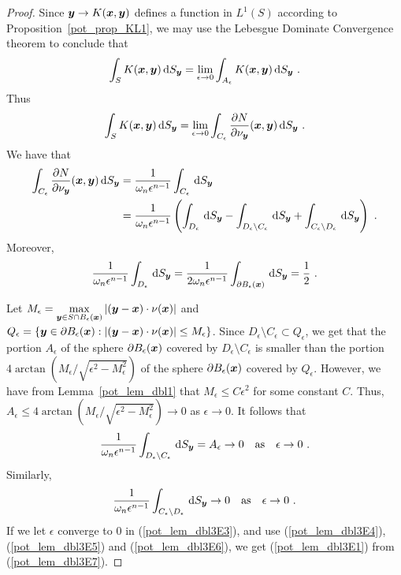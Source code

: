 \begin{proof}
Since ${\bm{y}} \to K({\bm{x}},{\bm{y}})$ defines a function in
$\displaystyle L^1(S)$
according to Proposition~\ref{pot_prop_KL1}, we may use the Lebesgue
Dominate Convergence theorem to conclude that
\[
\int_S  K({\bm{x}},{\bm{y}}) \,\mathrm{d}{S}_{{\bm{y}}}
= \lim_{\epsilon \to 0} \int_{A_\epsilon}  K({\bm{x}},{\bm{y}}) \,\mathrm{d}{S}_{{\bm{y}}} \ .
\]
Thus
\begin{equation} \label{pot_lem_dbl3E7}
\int_S  K(\VEC{x},\VEC{y}) \dss{S}{y}
= \lim_{\epsilon \to 0}
\int_{C_\epsilon} \pdydx{N}{\nu_\VEC{y}}(\VEC{x},\VEC{y}) \dss{S}{y} \ .
\end{equation}
We have that
\begin{align}
\int_{C_\epsilon} \frac{\partial{N}}{\partial \nu_{\bm{y}}}({\bm{x}},{\bm{y}}) \,\mathrm{d}{S}_{{\bm{y}}}
&= \frac{1}{\omega_n \epsilon^{n-1}} \int_{C_\epsilon} \,\mathrm{d}{S}_{{\bm{y}}} \nonumber \\
&= \frac{1}{\omega_n \epsilon^{n-1}} \left( \int_{D_\epsilon} \,\mathrm{d}{S}_{{\bm{y}}}
- \int_{D_\epsilon \setminus C_\epsilon} \,\mathrm{d}{S}_{{\bm{y}}}
+ \int_{C_\epsilon \setminus D_\epsilon} \,\mathrm{d}{S}_{{\bm{y}}} \right) \ .
\label{pot_lem_dbl3E3} 
\end{align}
Moreover,
\begin{equation} \label{pot_lem_dbl3E4}
\frac{1}{\omega_n \epsilon^{n-1}} \int_{D_\epsilon} \dss{S}{y}
= \frac{1}{2 \omega_n \epsilon^{n-1}}
\int_{\partial B_\epsilon(\VEC{x})} \dss{S}{y} = \frac{1}{2} \ .
\end{equation}

Let
$\displaystyle
M_\epsilon = \max_{{\bm{y}}\in S \cap B_\epsilon({\bm{x}})} \left|
  \left( {\bm{y}} - {\bm{x}}\right) \cdot \nu({\bm{x}}) \right|$
and
$Q_\epsilon = \left\{ {\bm{y}} \in \partial B_\epsilon({\bm{x}}) :
\left| ({\bm{y}} - {\bm{x}}) \cdot \nu({\bm{x}}) \right| \leq
M_\epsilon \right\}$.
Since $D_\epsilon \setminus C_\epsilon \subset Q_\epsilon$, we get
that the portion $A_\epsilon$ of the sphere
$\partial B_\epsilon({\bm{x}})$ covered by $D_\epsilon \setminus C_\epsilon$ 
is smaller than the portion
$\displaystyle 4 \arctan(M_\epsilon/\sqrt{\epsilon^2 - M_\epsilon^2})$
of the sphere $\partial B_\epsilon({\bm{x}})$ covered by $Q_\epsilon$. 
However, we have from Lemma~\ref{pot_lem_dbl1} that
$M_\epsilon \leq C \epsilon^2$ for some constant $C$.  Thus,
$A_\epsilon \leq 4 \arctan(M_\epsilon/\sqrt{\epsilon^2 - M_\epsilon^2}) \to 0$ 
as $\epsilon \to 0$.  It follows that
\begin{equation} \label{pot_lem_dbl3E5}
\frac{1}{\omega_n \epsilon^{n-1}} \int_{D_\epsilon \setminus C_\epsilon} \,\mathrm{d}{S}_{{\bm{y}}}
= A_\epsilon \to 0 \quad \text{as} \quad \epsilon \to 0 \ .
\end{equation}
Similarly,
\begin{equation} \label{pot_lem_dbl3E6}
\frac{1}{\omega_n \epsilon^{n-1}} \int_{C_\epsilon \setminus D_\epsilon} \,\mathrm{d}{S}_{{\bm{y}}}
\to 0 \quad \text{as} \quad \epsilon \to 0 \ .
\end{equation}
If we let $\epsilon$ converge to $0$ in (\ref{pot_lem_dbl3E3}), and
use (\ref{pot_lem_dbl3E4}), (\ref{pot_lem_dbl3E5}) and
(\ref{pot_lem_dbl3E6}), we get (\ref{pot_lem_dbl3E1}) from
(\ref{pot_lem_dbl3E7}).
\end{proof}

